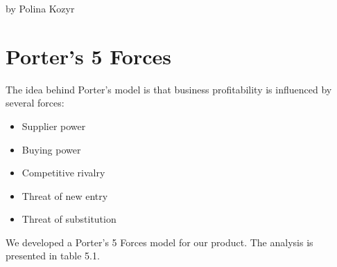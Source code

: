 by Polina Kozyr

\section{Porter's 5 Forces}

The idea behind Porter's model is that business profitability is influenced by several forces:

\begin{itemize}
\item Supplier power
\item Buying power
\item Competitive rivalry
\item Threat of new entry 
\item Threat of substitution
\end{itemize}
We developed a Porter's 5 Forces model for our product. The analysis is presented in table 5.1.

